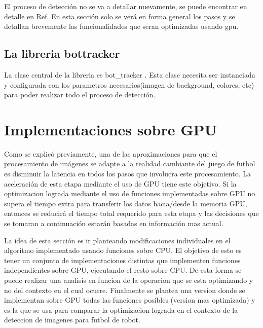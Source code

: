 \documentclass[a4paper,10pt]{report}
\begin{document}
El proceso de detección no se va a detallar nuevamente, se puede encontrar en detalle en Ref. \cite[capitulo 5]{Jaureguiberry}
En esta sección solo se verá en forma general los pasos y se detallan brevemente las funcionalidades que seran optimizadas usando gpu.


\subsection{La libreria bottracker}

La clase central de la libreria es bot\_tracker \cite[]{Jaureguiberry}. Esta clase necesita ser instanciada y configurada con los parametros necesarios(imagen de background, colores, etc) para poder realizar todo el proceso de detección.





\section{Implementaciones sobre GPU}
Como se explicó previamente, una de las aproximaciones para que el procesamiento de imágenes se adapte a la realidad cambiante del juego de futbol es disminuir la latencia en todos los pasos que involucra este procesamiento.
La aceleración de esta etapa mediante el uso de GPU tiene este objetivo. 
Si la optimizacion lograda mediante el uso de funciones implementadas sobre GPU no supera el tiempo extra para transferir los datos hacia/desde la memoria GPU, entonces se reducirá el tiempo total requerido para esta etapa y las decisiones que se tomaran a continuación estarán basadas en información mas actual.

La idea de esta sección es ir planteando modificaciones individuales en el algoritmo implementado usando funciones sobre CPU.
El objetivo de esto es tener un conjunto de implementaciones distintas que implementen funciones independientes sobre GPU, ejecutando el resto sobre CPU.
De esta forma se puede realizar una analisis en funcion de la operacion que se esta optimizando y no del contexto en el cual ocurre.
Finalmente se plantea una version donde se implementan sobre GPU todas las funciones posibles (version mas optimizada) y es la que se usa para comparar la optimizacion lograda en el contexto de la deteccion de imagenes para futbol de robot.
\end{document}
